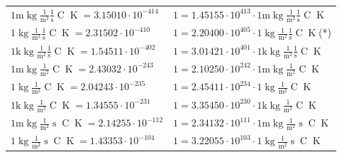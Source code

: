\begin{center}
\begin{longtable}{l l}
{\color{gray}$1 \bm{\mathrm{ m}}\operatorname{kg}\frac1{\operatorname{m}^2}\frac1{\operatorname{s}}{\operatorname{C}}{\operatorname{K}} = 3.15010\cdot10^{-414} $}   & {\color{gray}$ 1 = 1.45155\cdot10^{413} \cdot 1 \bm{\mathrm{ m}}\operatorname{kg}\frac1{\operatorname{m}^2}\frac1{\operatorname{s}}{\operatorname{C}}{\operatorname{K}}$}  \\
{\color{black}$1 \bm{\mathrm{ }}\operatorname{kg}\frac1{\operatorname{m}^2}\frac1{\operatorname{s}}{\operatorname{C}}{\operatorname{K}} = 2.31502\cdot10^{-410} $}   & {\color{black}$ 1 = 2.20400\cdot10^{405} \cdot 1 \bm{\mathrm{ }}\operatorname{kg}\frac1{\operatorname{m}^2}\frac1{\operatorname{s}}{\operatorname{C}}{\operatorname{K}}$}\quad(*)\\
{\color{gray}$1 \bm{\mathrm{ k}}\operatorname{kg}\frac1{\operatorname{m}^2}\frac1{\operatorname{s}}{\operatorname{C}}{\operatorname{K}} = 1.54511\cdot10^{-402} $}   & {\color{gray}$ 1 = 3.01421\cdot10^{401} \cdot 1 \bm{\mathrm{ k}}\operatorname{kg}\frac1{\operatorname{m}^2}\frac1{\operatorname{s}}{\operatorname{C}}{\operatorname{K}}$}  \\
{\color{gray}$1 \bm{\mathrm{ m}}\operatorname{kg}\frac1{\operatorname{m}^2}{}{\operatorname{C}}{\operatorname{K}} = 2.43032\cdot10^{-243} $}   & {\color{gray}$ 1 = 2.10250\cdot10^{242} \cdot 1 \bm{\mathrm{ m}}\operatorname{kg}\frac1{\operatorname{m}^2}{}{\operatorname{C}}{\operatorname{K}}$}  \\
{\color{black}$1 \bm{\mathrm{ }}\operatorname{kg}\frac1{\operatorname{m}^2}{}{\operatorname{C}}{\operatorname{K}} = 2.04243\cdot10^{-235} $}   & {\color{black}$ 1 = 2.45411\cdot10^{234} \cdot 1 \bm{\mathrm{ }}\operatorname{kg}\frac1{\operatorname{m}^2}{}{\operatorname{C}}{\operatorname{K}}$}  \\
{\color{gray}$1 \bm{\mathrm{ k}}\operatorname{kg}\frac1{\operatorname{m}^2}{}{\operatorname{C}}{\operatorname{K}} = 1.34555\cdot10^{-231} $}   & {\color{gray}$ 1 = 3.35450\cdot10^{230} \cdot 1 \bm{\mathrm{ k}}\operatorname{kg}\frac1{\operatorname{m}^2}{}{\operatorname{C}}{\operatorname{K}}$}  \\
{\color{gray}$1 \bm{\mathrm{ m}}\operatorname{kg}\frac1{\operatorname{m}^2}{\operatorname{s}}{\operatorname{C}}{\operatorname{K}} = 2.14255\cdot10^{-112} $}   & {\color{gray}$ 1 = 2.34132\cdot10^{111} \cdot 1 \bm{\mathrm{ m}}\operatorname{kg}\frac1{\operatorname{m}^2}{\operatorname{s}}{\operatorname{C}}{\operatorname{K}}$}  \\
{\color{black}$1 \bm{\mathrm{ }}\operatorname{kg}\frac1{\operatorname{m}^2}{\operatorname{s}}{\operatorname{C}}{\operatorname{K}} = 1.43353\cdot10^{-104} $}   & {\color{black}$ 1 = 3.22055\cdot10^{103} \cdot 1 \bm{\mathrm{ }}\operatorname{kg}\frac1{\operatorname{m}^2}{\operatorname{s}}{\operatorname{C}}{\operatorname{K}}$}  \\

\end{longtable}
\end{center}
